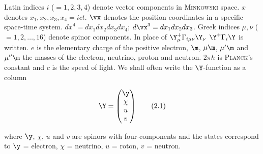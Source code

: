 \documentclass{article}
\newcommand{\nequ}[2]{
\begin{align*}
#1
\tag{#2}
\end{align*}
}
\begin{document}
Latin indices $i$ ($=1,2,3,4$) denote vector components in \textsc{Minkowski} space. $x$ denotes $x_1,x_2,x_3,x_4 = ict$. $\vx$ denotes the position coordinates in a specific space-time system. ${dx}^4 = {dx_1}{dx_2}{dx_3}{dx_4}$; ${d\vx}^3 = {dx_1}{dx_2}{dx_3}$. Greek indices $\mu,\nu$ ($=1,2,\dots,16$) denote spinor components. In place of $\Y^+_\mu \Gamma_{i\mu\nu} \Y_\nu$ $\Y^+\Gamma_i \Y$ is written. $e$ is the elementary charge of the positive electron, $\m$, $\mu\m$, $\mu'\m$ and $\mu''\m$ the masses of the electron, neutrino, proton and neutron. $2\pi h$ is \textsc{Planck}'s constant and $c$ is the speed of light. We shall often write the $\Y$-function as a column
\nequ{
\Y = \left(\begin{matrix}
\y\\
\chi\\
u\\
v
\end{matrix}
\right)
}{2.1}
where $\y$, $\chi$, $u$ and $v$ are spinors with four-components and the states correspond to $\y$ = electron, $\chi$ = neutrino, $u$ = roton, $v$ = neutron.
\end{document}
